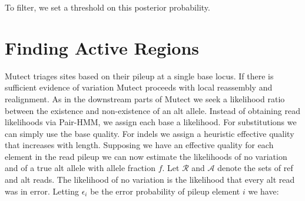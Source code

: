 \documentclass[nofootinbib,amssymb,amsmath]{revtex4}
\begin{document}
To filter, we set a threshold on this posterior probability.

\section{Finding Active Regions}
Mutect triages sites based on their pileup at a single base locus.  If there is sufficient evidence of variation Mutect proceeds with local reassembly and realignment.  As in the downstream parts of Mutect we seek a likelihood ratio between the existence and non-existence of an alt allele.  Instead of obtaining read likelihoods via Pair-HMM, we assign each base a likelihood.  For substitutions we can simply use the base quality.  For indels we assign a heuristic effective quality that increases with length.  Supposing we have an effective quality for each element in the read pileup we can now estimate the likelihoods of no variation and of a true alt allele with allele fraction $f$.  Let $\mathcal{R}$ and $\mathcal{A}$ denote the sets of ref and alt reads.  The likelihood of no variation is the likelihood that every alt read was in error.  Letting $\epsilon_i$ be the error probability of pileup element $i$ we have:
\end{document}
